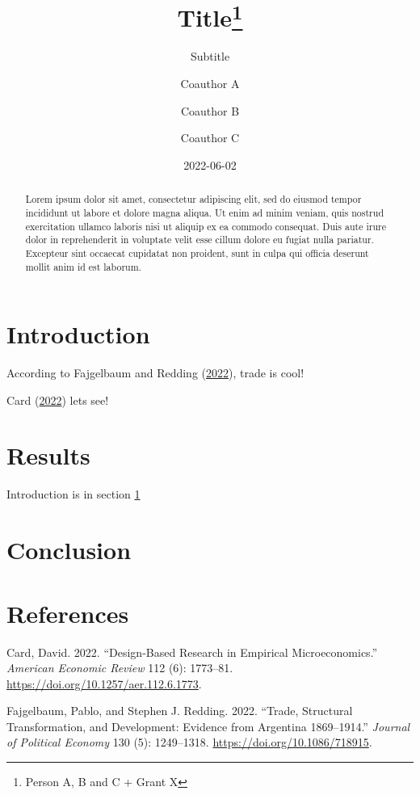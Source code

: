 \documentclass[
  12pt,
]{article}
\title{Title\thanks{Person A, B and C + Grant X}}
\subtitle{Subtitle}
\author{Coauthor A \and Coauthor B \and Coauthor C}
\date{2022-06-02}
\newlength{\cslhangindent}
\newlength{\cslentryspacingunit} %
\newenvironment{CSLReferences}[2] %
 {%
  \setlength{\parindent}{0pt}
  \ifodd #1
  \let\oldpar\par
  \def\par{\hangindent=\cslhangindent\oldpar}
  \fi
  \setlength{\parskip}{#2\cslentryspacingunit}
 }%
 {}
\begin{document}
\maketitle
\begin{abstract}
Lorem ipsum dolor sit amet, consectetur adipiscing elit, sed do eiusmod tempor incididunt ut labore et dolore magna aliqua. Ut enim ad minim veniam, quis nostrud exercitation ullamco laboris nisi ut aliquip ex ea commodo consequat. Duis aute irure dolor in reprehenderit in voluptate velit esse cillum dolore eu fugiat nulla pariatur. Excepteur sint occaecat cupidatat non proident, sunt in culpa qui officia deserunt mollit anim id est laborum.
\end{abstract}

\newpage

\hypertarget{intro}{%
\section{Introduction}\label{intro}}

According to Fajgelbaum and Redding (\protect\hyperlink{ref-fajgelbaum_trade_2022}{2022}), trade is cool!

Card (\protect\hyperlink{ref-card_design-based_2022}{2022}) lets see!

\hypertarget{results}{%
\section{Results}\label{results}}

Introduction is in section \ref{intro}

\hypertarget{conclusion}{%
\section{Conclusion}\label{conclusion}}

\hypertarget{references}{%
\section*{References}\label{references}}

\hypertarget{refs_main}{}
\begin{CSLReferences}{1}{0}
\leavevmode{}%
Card, David. 2022. {``Design-{Based} {Research} in {Empirical} {Microeconomics}.''} \emph{American Economic Review} 112 (6): 1773--81. \url{https://doi.org/10.1257/aer.112.6.1773}.

\leavevmode{}%
Fajgelbaum, Pablo, and Stephen J. Redding. 2022. {``Trade, {Structural} {Transformation}, and {Development}: {Evidence} from {Argentina} 1869--1914.''} \emph{Journal of Political Economy} 130 (5): 1249--1318. \url{https://doi.org/10.1086/718915}.

\end{CSLReferences}
\end{document}
